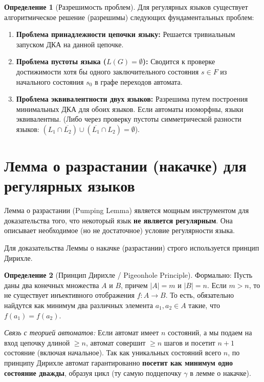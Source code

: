 \documentclass[12pt,a4paper]{article}
\theoremstyle{definition}
\newtheorem{definition}{Определение}
\theoremstyle{plain}
\theoremstyle{remark}
\begin{document}
\begin{definition}[Разрешимость проблем]
Для регулярных языков существует алгоритмическое решение (разрешимы) следующих фундаментальных проблем:
\begin{enumerate}
    \item \textbf{Проблема принадлежности цепочки языку:} Решается тривиальным запуском ДКА на данной цепочке.
    \item \textbf{Проблема пустоты языка ($L(G) = \emptyset$):} Сводится к проверке достижимости хотя бы одного заключительного состояния $s \in F$ из начального состояния $s_0$ в графе переходов автомата.
    \item \textbf{Проблема эквивалентности двух языков:} Разрешима путем построения минимальных ДКА для обоих языков. Если автоматы изоморфны, языки эквивалентны. (Либо через проверку пустоты симметрической разности языков: $(L_1 \cap \overline{L_2}) \cup (\overline{L_1} \cap L_2) = \emptyset$).
\end{enumerate}
\end{definition}

\section{Лемма о разрастании (накачке) для регулярных языков}

Лемма о разрастании (Pumping Lemma) является мощным инструментом для доказательства того, что некоторый язык \textbf{не является регулярным}. Она описывает необходимое (но не достаточное) условие регулярности языка.

Для доказательства Леммы о накачке (разрастании) строго используется принцип Дирихле.

\begin{definition}[Принцип Дирихле / Pigeonhole Principle]
Формально: Пусть даны два конечных множества $A$ и $B$, причем $|A| = m$ и $|B| = n$. Если $m > n$, то не существует инъективного отображения $f: A \to B$. То есть, обязательно найдутся как минимум два различных элемента $a_1, a_2 \in A$ такие, что $f(a_1) = f(a_2)$.
\end{definition}

\textit{Связь с теорией автоматов:} Если автомат имеет $n$ состояний, а мы подаем на вход цепочку длиной $\ge n$, автомат совершит $\ge n$ шагов и посетит $n+1$ состояние (включая начальное). Так как уникальных состояний всего $n$, по принципу Дирихле автомат гарантированно \textbf{посетит как минимум одно состояние дважды}, образуя цикл (ту самую подцепочку $\gamma$ в лемме о накачке).
\end{document}
